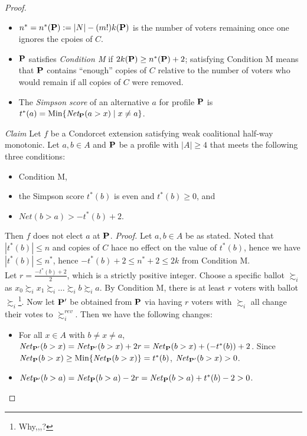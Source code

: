 \begin{proof}
\begin{itemize}
        \item $n^\ast = n^\ast(\mathbf{P}) := |N| - (m!)k(\mathbf{P})$ is the number of voters remaining once one ignores the cpoies of $C$.
        \item $\mathbf{P}$ satisfies \emph{Condition M} if $2k(\mathbf{P}) \geq n^\ast (\mathbf{P}) +2$; satisfying Condition M means that $\mathbf{P}$ contains ``enough'' copies of $C$ relative to the number of voters who would remain if all copies of $C$ were removed. 
        \item The \emph{Simpson score} of an alternative $a$ for profile $\mathbf{P}$ is $t^\ast (a) = \mbox{Min} \{\textit{Net}_{\mathbf{P}} (a > x) \;|\; x \neq a\}$.
    \end{itemize}
    \emph{Claim} Let $f$ be a Condorcet extension satisfying weak coalitional half-way monotonic. Let $a ,b \in A$ and $\mathbf{P}$ be a profile with $|A| \geq 4$ that meets the following three conditions:
    \begin{itemize}
        \item Condition M,
        \item the Simpson score $t^\ast(b)$ is even and $t^\ast (b) \geq 0$, and
        \item $\mathit{Net}(b > a) > - t^\ast (b) +2$.
    \end{itemize}
    Then $f$ does not elect $a$ at $\mathbf{P}$.
    \emph{Proof.} Let $a, b \in A$ be as stated. Noted that $|t^\ast (b)| \leq n$ and copies of $C$ hace no effect on the value of $t^\ast (b)$, hence we have $|t^\ast (b)| \leq n^\ast$, hence $- t^\ast (b) + 2 \leq n^\ast +2 \leq 2k$ from Condition M.\\
    Let $r = \frac{- t^\ast (b) + 2}{2}$, which is a strictly positive integer. Choose a specific ballot $\succsim_i$ as $x_0 \succsim_i x_1 \succsim_i \dots \succsim_i b \succsim_i a$. By Condition M, there is at least $r$ voters with ballot $\succsim_i$\footnote{Why,,,?}. Now let $\mathbf{P}'$ be obtained from $\mathbf{P}$ via having $r$ voters with $\succsim_i$ all change their votes to $\succsim^{rev}_i$. Then we have the following changes:
    \begin{itemize}
        \item For all $x \in A$ with $b \neq x \neq a$, $\mathit{Net}_{\mathbf{P}'}(b > x) = \mathit{Net}_{\mathbf{P}'}(b > x) + 2r = \mathit{Net}_{\mathbf{P}} (b>x) + (-t^\ast (b)) +2$. Since $\mathit{Net}_{\mathbf{P}} (b>x) \geq \mbox{Min}\{\mathit{Net}_{\mathbf{P}} (b>x)\} = t^\ast (b)$, $\mathit{Net}_{\mathbf{P}'}(b > x) > 0$.
        \item $\mathit{Net}_{\mathbf{P}'}(b > a) = \mathit{Net}_{\mathbf{P}}(b > a) - 2r = \mathit{Net}_{\mathbf{P}} (b >a) + t^\ast (b) - 2 > 0$.

\end{itemize}
\end{proof}
